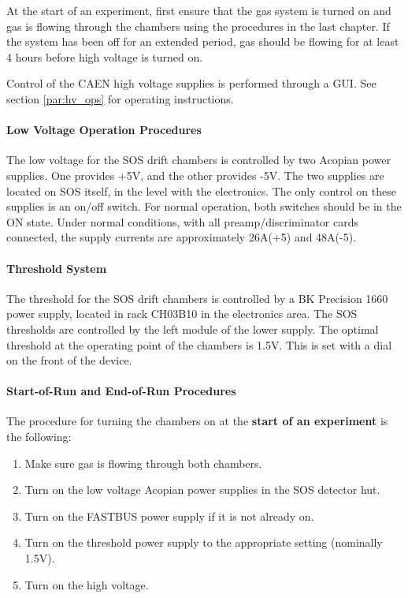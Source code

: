 \begin{obsolete}
At the start of an experiment, first ensure that the gas system is
turned on and gas is flowing through the chambers using the procedures
in the last chapter.  If the system has been off for an extended
period, gas should be flowing for at least 4 hours before high
voltage is turned on.

Control of the CAEN high voltage supplies is performed through
a GUI. See section \ref{par:hv_ops} for operating instructions.

\paragraph{Low Voltage Operation Procedures}

The low voltage for the SOS drift chambers is controlled by two
Acopian power supplies.  One provides +5V, and the other provides -5V.
The two supplies are located on SOS itself, in the level with the
electronics.  The only control on these supplies is an on/off
switch.  For normal operation, both switches should be in the ON
state.  Under normal conditions, with all preamp/discriminator cards
connected, the supply currents are approximately 26A(+5) and 48A(-5).

\paragraph{Threshold System}

The threshold for the SOS drift chambers is controlled by a BK
Precision 1660 power supply, located in rack CH03B10 in the
electronics area.  The SOS thresholds are controlled by the left
module of the lower supply.  The optimal threshold at the operating
point of the chambers is 1.5V.  This is set with a dial on the front
of the device.

\paragraph{Start-of-Run and End-of-Run Procedures}

The procedure for turning the chambers on at the {\bf start of an
experiment} is the following:

\begin{enumerate}
\item{Make sure gas is flowing through both chambers.}
\item{Turn on the low voltage Acopian power supplies in the SOS
      detector hut.}
\item{Turn on the FASTBUS power supply if it is not already on.}
\item{Turn on the threshold power supply to the appropriate setting
      (nominally 1.5V).}
\item{Turn on the high voltage.}
\end{enumerate}


\end{obsolete}
